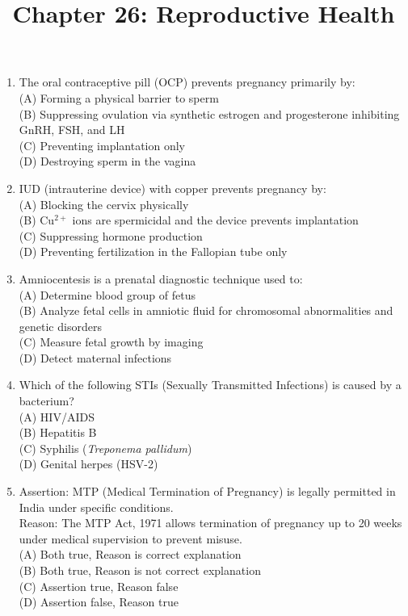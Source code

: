 \documentclass{article}
\begin{document}
\title{Chapter 26: Reproductive Health}
\date{}
\maketitle

\begin{enumerate}[label=Q\arabic*.]

\item The oral contraceptive pill (OCP) prevents pregnancy primarily by:
\\(A) Forming a physical barrier to sperm
\\(B) Suppressing ovulation via synthetic estrogen and progesterone inhibiting GnRH, FSH, and LH
\\(C) Preventing implantation only
\\(D) Destroying sperm in the vagina

\item IUD (intrauterine device) with copper prevents pregnancy by:
\\(A) Blocking the cervix physically
\\(B) Cu$^{2+}$ ions are spermicidal and the device prevents implantation
\\(C) Suppressing hormone production
\\(D) Preventing fertilization in the Fallopian tube only

\item Amniocentesis is a prenatal diagnostic technique used to:
\\(A) Determine blood group of fetus
\\(B) Analyze fetal cells in amniotic fluid for chromosomal abnormalities and genetic disorders
\\(C) Measure fetal growth by imaging
\\(D) Detect maternal infections

\item Which of the following STIs (Sexually Transmitted Infections) is caused by a bacterium?
\\(A) HIV/AIDS
\\(B) Hepatitis B
\\(C) Syphilis (\textit{Treponema pallidum})
\\(D) Genital herpes (HSV-2)

\item Assertion: MTP (Medical Termination of Pregnancy) is legally permitted in India under specific conditions.\\
Reason: The MTP Act, 1971 allows termination of pregnancy up to 20 weeks under medical supervision to prevent misuse.
\\(A) Both true, Reason is correct explanation
\\(B) Both true, Reason is not correct explanation
\\(C) Assertion true, Reason false
\\(D) Assertion false, Reason true


\end{enumerate}
\end{document}
